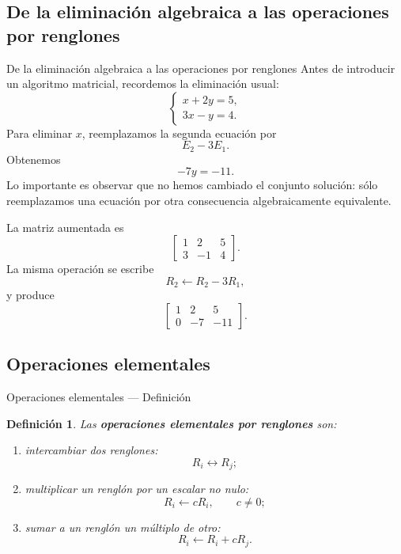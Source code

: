 \documentclass[aspectratio=169,11pt]{beamer}
\newtheorem{definicion}{Definición}[section]
\theoremstyle{remark}
\begin{document}
\subsection*{De la eliminación algebraica a las operaciones por renglones}
\begin{frame}[allowframebreaks]{De la eliminación algebraica a las operaciones por renglones}
\footnotesize
Antes de introducir un algoritmo matricial, recordemos la eliminación usual:
\[
\begin{cases}
x+2y=5,\\
3x-y=4.
\end{cases}
\]
Para eliminar $x$, reemplazamos la segunda ecuación por
\[
E_2-3E_1.
\]
Obtenemos
\[
-7y=-11.
\]
Lo importante es observar que no hemos cambiado el conjunto solución: sólo reemplazamos una ecuación por otra consecuencia algebraicamente equivalente.

La matriz aumentada es
\[
\left[
\begin{array}{cc|c}
1&2&5\\
3&-1&4
\end{array}
\right].
\]
La misma operación se escribe
\[
R_2\leftarrow R_2-3R_1,
\]
y produce
\[
\left[
\begin{array}{cc|c}
1&2&5\\
0&-7&-11
\end{array}
\right].
\]
\end{frame}

\subsection*{Operaciones elementales}
\begin{frame}[shrink=5]{Operaciones elementales — Definición}
\footnotesize
\begin{definicion}
Las \textbf{operaciones elementales por renglones} son:
\begin{enumerate}
\item intercambiar dos renglones:
\[
R_i\leftrightarrow R_j;
\]
\item multiplicar un renglón por un escalar no nulo:
\[
R_i\leftarrow cR_i,\qquad c\neq0;
\]
\item sumar a un renglón un múltiplo de otro:
\[
R_i\leftarrow R_i+cR_j.
\]
\end{enumerate}
\end{definicion}
\end{frame}
\end{document}
